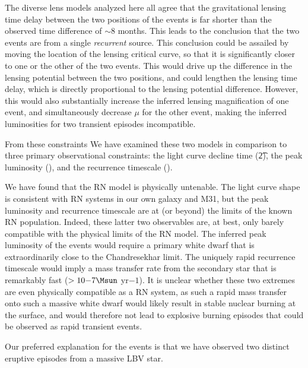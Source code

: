 The diverse lens models analyzed here all agree that the gravitational
lensing time delay between the two positions of the \spock events is
far shorter than the observed time difference of $\sim$8 months.  This
leads to the conclusion that the two events are from a single {\em
  recurrent} source.  This conclusion could be assailed by moving the
location of the lensing critical curve, so that it is significantly
closer to one or the other of the two events.  This would drive up the
difference in the lensing potential between the two \spock positions,
and could lengthen the lensing time delay, which is directly
proportional to the lensing potential difference.  However, this would
also substantially increase the inferred lensing magnification of one
event, and simultaneously decrease $\mu$ for the other event, making
the inferred luminosities for two transient episodes incompatible.



From these constraints 
We have examined these two models in comparison to three primary
observational constraints: the light curve decline time (\t2), the
peak luminosity (\Lpk), and the recurrence timescale (\trec).

We have found that the RN model is physically untenable. The light
curve shape is consistent with RN systems in our own galaxy and M31,
but the peak luminosity and recurrence timescale are at (or beyond)
the limits of the known RN population.  Indeed, these latter two
observables are, at best, only barely compatible with the physical
limits of the RN model. The inferred peak luminosity of the \spock
events would require a primary white dwarf that is extraordinarily
close to the Chandresekhar limit.  The uniquely rapid recurrence
timescale would imply a mass transfer rate from the secondary star
that is remarkably fast ($>10{-7} \Msun$ yr${-1}$).  It is unclear
whether these two extremes are even physically compatible as a RN
system, as such a rapid mass transfer onto such a massive white dwarf
would likely result in stable nuclear burning at the surface, and
would therefore not lead to explosive burning episodes that could be
observed as rapid transient events.

Our preferred explanation for the \spock events is that we have
observed two distinct eruptive episodes from a massive LBV star. 

